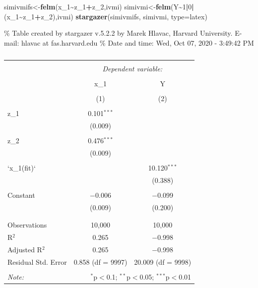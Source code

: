 \documentclass[
]{article}
\newenvironment{Shaded}{\begin{snugshade}}{\end{snugshade}}
\newcommand{\DataTypeTok}[1]{\textcolor[rgb]{0.13,0.29,0.53}{#1}}
\newcommand{\DecValTok}[1]{\textcolor[rgb]{0.00,0.00,0.81}{#1}}
\newcommand{\KeywordTok}[1]{\textcolor[rgb]{0.13,0.29,0.53}{\textbf{#1}}}
\newcommand{\NormalTok}[1]{#1}
\newcommand{\OperatorTok}[1]{\textcolor[rgb]{0.81,0.36,0.00}{\textbf{#1}}}
\newcommand{\StringTok}[1]{\textcolor[rgb]{0.31,0.60,0.02}{#1}}
\begin{document}
\begin{Shaded}
\begin{Highlighting}[]
\NormalTok{simivmifs\textless{}{-}}\KeywordTok{felm}\NormalTok{(x\_}\DecValTok{1}\OperatorTok{\textasciitilde{}}\NormalTok{z\_}\DecValTok{1}\OperatorTok{+}\NormalTok{z\_}\DecValTok{2}\NormalTok{,ivmi)}
\NormalTok{simivmi\textless{}{-}}\KeywordTok{felm}\NormalTok{(Y}\OperatorTok{\textasciitilde{}}\DecValTok{1}\OperatorTok{|}\DecValTok{0}\OperatorTok{|}\NormalTok{(x\_}\DecValTok{1}\OperatorTok{\textasciitilde{}}\NormalTok{z\_}\DecValTok{1}\OperatorTok{+}\NormalTok{z\_}\DecValTok{2}\NormalTok{),ivmi)}
\KeywordTok{stargazer}\NormalTok{(simivmifs, simivmi,  }\DataTypeTok{type=}\StringTok{\textquotesingle{}latex\textquotesingle{}}\NormalTok{)}
\end{Highlighting}
\end{Shaded}

\% Table created by stargazer v.5.2.2 by Marek Hlavac, Harvard
University. E-mail: hlavac at fas.harvard.edu \% Date and time: Wed, Oct
07, 2020 - 3:49:42 PM

\begin{table}[!htbp] \centering 
  \caption{} 
  \label{} 
\begin{tabular}{@{\extracolsep{5pt}}lcc} 
\\[-1.8ex]\hline 
\hline \\[-1.8ex] 
 & \multicolumn{2}{c}{\textit{Dependent variable:}} \\ 
\cline{2-3} 
\\[-1.8ex] & x\_1 & Y \\ 
\\[-1.8ex] & (1) & (2)\\ 
\hline \\[-1.8ex] 
 z\_1 & 0.101$^{***}$ &  \\ 
  & (0.009) &  \\ 
  & & \\ 
 z\_2 & 0.476$^{***}$ &  \\ 
  & (0.009) &  \\ 
  & & \\ 
 `x\_1(fit)` &  & 10.120$^{***}$ \\ 
  &  & (0.388) \\ 
  & & \\ 
 Constant & $-$0.006 & $-$0.099 \\ 
  & (0.009) & (0.200) \\ 
  & & \\ 
\hline \\[-1.8ex] 
Observations & 10,000 & 10,000 \\ 
R$^{2}$ & 0.265 & $-$0.998 \\ 
Adjusted R$^{2}$ & 0.265 & $-$0.998 \\ 
Residual Std. Error & 0.858 (df = 9997) & 20.009 (df = 9998) \\ 
\hline 
\hline \\[-1.8ex] 
\textit{Note:}  & \multicolumn{2}{r}{$^{*}$p$<$0.1; $^{**}$p$<$0.05; $^{***}$p$<$0.01} \\ 
\end{tabular} 
\end{table}
\end{document}
